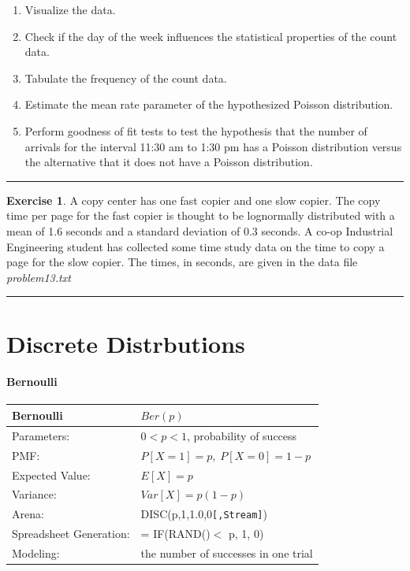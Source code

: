 \documentclass[
]{book}
\providecommand{\tightlist}{%
  \setlength{\itemsep}{0pt}\setlength{\parskip}{0pt}}
\theoremstyle{definition}
\theoremstyle{definition}
\theoremstyle{definition}
\newtheorem{exercise}{Exercise}[chapter]
\theoremstyle{definition}
\theoremstyle{remark}
\begin{document}
\begin{enumerate}
\def\labelenumi{\arabic{enumi}.}
\tightlist
\item
  Visualize the data.
\item
  Check if the day of the week influences the statistical properties
  of the count data.
\item
  Tabulate the frequency of the count data.
\item
  Estimate the mean rate parameter of the hypothesized Poisson
  distribution.
\item
  Perform goodness of fit tests to test the hypothesis that the number
  of arrivals for the interval 11:30 am to 1:30 pm has a Poisson
  distribution versus the alternative that it does not have a Poisson
  distribution.
\end{enumerate}

\begin{center}\rule{0.5\linewidth}{0.5pt}\end{center}

\begin{exercise}
\protect\hypertarget{exr:AppDistFitP13}{}{\label{exr:AppDistFitP13} }A copy center has one fast copier
and one slow copier. The copy time per page for the fast copier is
thought to be lognormally distributed with a mean of 1.6 seconds and a
standard deviation of 0.3 seconds. A co-op Industrial Engineering
student has collected some time study data on the time to copy a page
for the slow copier. The times, in seconds, are given in the data file \emph{problem13.txt}
\end{exercise}

\begin{center}\rule{0.5\linewidth}{0.5pt}\end{center}

\cleardoublepage

\hypertarget{app:DiscreteDistributions}{%
\chapter{Discrete Distrbutions}\label{app:DiscreteDistributions}}

\hypertarget{bernoulli}{%
\subsubsection*{Bernoulli}\label{bernoulli}}


\begin{longtable}[]{@{}ll@{}}
\toprule
\textbf{Bernoulli} & \(Ber(p)\) \\
\midrule
\endhead
Parameters: & \(0 < p < 1\), probability of success \\
PMF: & \(P[X=1] = p, \; P[X=0] = 1-p\) \\
Expected Value: & \(E[X] = p\) \\
Variance: & \(Var[X] = p(1-p)\) \\
Arena: & DISC(p,1,1.0,0\texttt{{[},Stream{]}}) \\
Spreadsheet Generation: & = IF(RAND()\(<\) p, 1, 0) \\
Modeling: & the number of successes in one trial \\
\bottomrule
\end{longtable}
\end{document}
